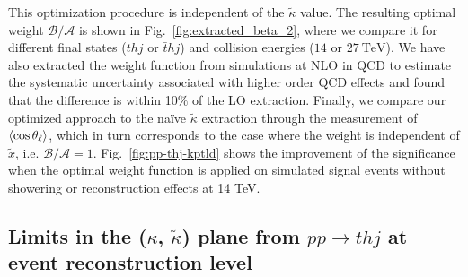 \documentclass[11pt,a4paper]{article}
\newcommand {\e}[1]{\mathrm{~#1}}
\newcommand{\mc}[1]{\mathcal{#1}}
\begin{document}
This optimization procedure is independent of the $\tilde \kappa$ value. The resulting optimal weight $\mc{B}/\mc{A}$ is shown in Fig.~\ref{fig:extracted_beta_2}, where we compare it for different final states ($t h j$ or $\bar t h j$) and collision energies ($14$ or $27\e{TeV}$). We have also extracted the weight function from simulations at NLO in QCD to estimate the systematic uncertainty associated with higher order QCD effects and found that the difference is within 10$\%$ of the LO extraction. Finally, we compare our optimized approach to the na\"ive $\tilde \kappa$ extraction through the measurement of $\Braket{\cos \theta_\ell}$, which in turn corresponds to the case where the weight is independent of $\tilde x$, i.e. $\mc{B}/\mc{A} = 1$.
Fig.~\ref{fig:pp-thj-kptld} shows the improvement of the significance when the optimal weight function is applied on simulated signal events without showering or reconstruction effects at 14 TeV.

\subsection{Limits in the ($\kappa$, $\tilde{\kappa}$) plane from $pp\to thj$ at event reconstruction level}
\end{document}
